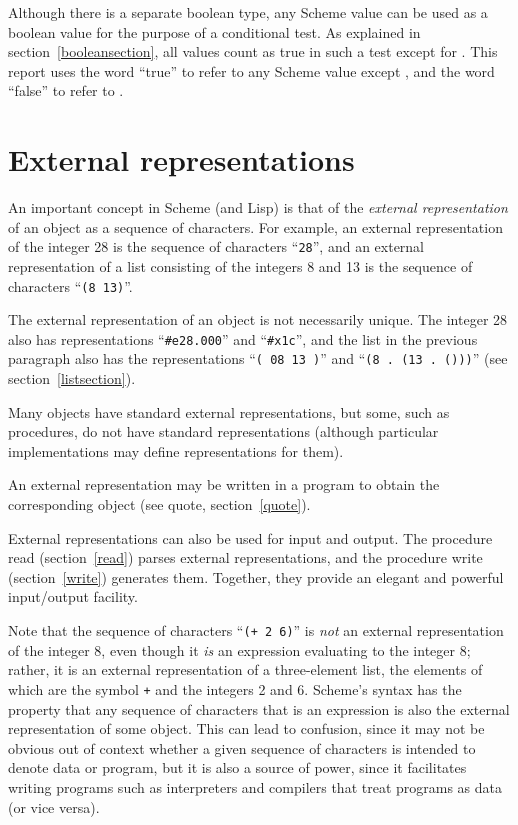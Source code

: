 Although there is a separate boolean type,
any Scheme value can be used as a boolean value for the purpose of a
conditional test.  As explained in section~\ref{booleansection}, all
values count as true in such a test except for \schfalse{}.
This report uses the word ``true'' to refer to any
Scheme value except \schfalse{}, and the word ``false'' to refer to
\schfalse{}.  

\section{External representations}
\label{externalreps}

An important concept in Scheme (and Lisp) is that of the {\em external
representation} of an object as a sequence of characters.  For example,
an external representation of the integer 28 is the sequence of
characters ``{\tt 28}'', and an external representation of a list consisting
of the integers 8 and 13 is the sequence of characters ``{\tt(8 13)}''.

The external representation of an object is not necessarily unique.  The
integer 28 also has representations ``{\tt \#e28.000}'' and ``{\tt\#x1c}'', and the
list in the previous paragraph also has the representations ``{\tt( 08 13
)}'' and ``{\tt(8 .\ (13 .\ ()))}'' (see section~\ref{listsection}).

Many objects have standard external representations, but some, such as
procedures, do not have standard representations (although particular
implementations may define representations for them).

An external representation may be written in a program to obtain the
corresponding object (see {\cf quote}, section~\ref{quote}).

External representations can also be used for input and output.  The
procedure {\cf read} (section~\ref{read}) parses external
representations, and the procedure {\cf write} (section~\ref{write})
generates them.  Together, they provide an elegant and powerful
input/output facility.

Note that the sequence of characters ``{\tt(+ 2 6)}'' is {\em not} an
external representation of the integer 8, even though it {\em is} an
expression evaluating to the integer 8; rather, it is an external
representation of a three-element list, the elements of which are the symbol
{\tt +} and the integers 2 and 6.  Scheme's syntax has the property that
any sequence of characters that is an expression is also the external
representation of some object.  This can lead to confusion, since it may
not be obvious out of context whether a given sequence of characters is
intended to denote data or program, but it is also a source of power,
since it facilitates writing programs such as interpreters and
compilers that treat programs as data (or vice versa).


